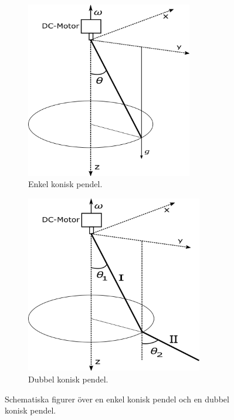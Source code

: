 \documentclass[12pt,a4paper]{article}
\begin{document}
\begin{figure}[H]
    \centering
    \begin{subfigure}[b]{0.45\textwidth}
        \centering
        \includegraphics[width=0.8\textwidth]{SkissPendel/g17413.png}
        \caption{Enkel konisk pendel.}
    \end{subfigure}
    \hfill
    \begin{subfigure}[b]{0.45\textwidth}
        \centering
        \includegraphics[width=0.85\textwidth]{SkissPendel/text18318-2.png}
        \caption{ Dubbel konisk pendel.}
    \end{subfigure}
    \caption{Schematiska figurer över en enkel konisk pendel och en dubbel konisk pendel.}
    \label{upp:gxuppgf}
\end{figure}
\end{document}
